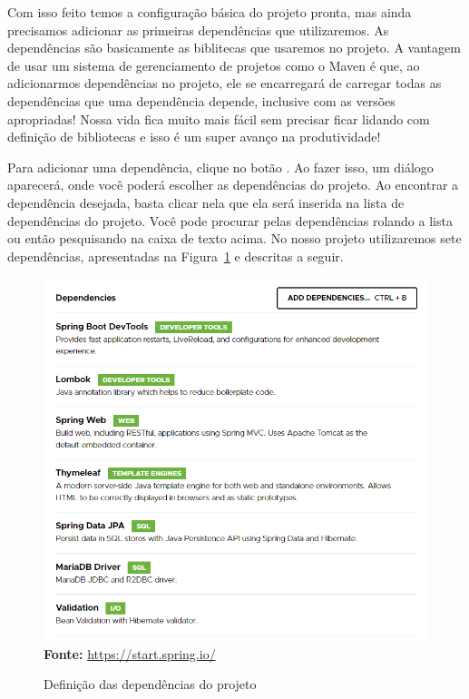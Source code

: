 Com isso feito temos a configuração básica do projeto pronta, mas ainda precisamos adicionar as primeiras dependências que utilizaremos. As dependências são basicamente as biblitecas que usaremos no projeto. A vantagem de usar um sistema de gerenciamento de projetos como o Maven é que, ao adicionarmos dependências no projeto, ele se encarregará de carregar todas as dependências que uma dependência depende, inclusive com as versões apropriadas! Nossa vida fica muito mais fácil sem precisar ficar lidando com definição de bibliotecas e isso é um super avanço na produtividade!

Para adicionar uma dependência, clique no botão . Ao fazer isso, um diálogo aparecerá, onde você poderá escolher as dependências do projeto. Ao encontrar a dependência desejada, basta clicar nela que ela será inserida na lista de dependências do projeto. Você pode procurar pelas dependências rolando a lista ou então pesquisando na caixa de texto acima. No nosso projeto utilizaremos sete dependências, apresentadas na Figura~\ref{fig:cap10SpringInitializrConfProjeto02} e descritas a seguir.

\FloatBarrier
\begin{figure}[!htbp]
    \centering
    \caption{Definição das dependências do projeto}
    \includegraphics[scale=0.7]{imagens/cap10SpringInitializrConfProjeto02}
    \\\textbf{Fonte:} \url{https://start.spring.io/}
    \label{fig:cap10SpringInitializrConfProjeto02}
\end{figure}
\FloatBarrier

